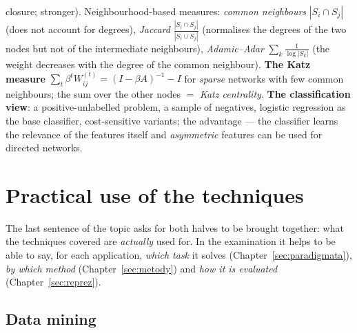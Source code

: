 \documentclass[11pt,a4paper]{article}
\theoremstyle{definition}
\begin{document}
\begin{itemize}
      closure; stronger). Neighbourhood-based measures: \emph{common neighbours} $|S_i\cap S_j|$ (does
      not account for degrees), \emph{Jaccard} $\frac{|S_i\cap S_j|}{|S_i\cup S_j|}$ (normalises the
      degrees of the two nodes but not of the intermediate neighbours), \emph{Adamic--Adar}
      $\sum_{k}\frac{1}{\log|S_k|}$ (the weight decreases with the degree of the common neighbour).
      \textbf{The Katz measure} $\sum_t\beta^tW_{ij}^{(t)}=(I-\beta A)^{-1}-I$ for \emph{sparse}
      networks with few common neighbours; the sum over the other nodes $=$ \emph{Katz centrality}.
      \textbf{The classification view}: a positive-unlabelled problem, a sample of negatives, logistic
      regression as the base classifier, cost-sensitive variants; the advantage --- the classifier
      learns the relevance of the features itself and \emph{asymmetric} features can be used for
      directed networks.
\end{itemize}

\newpage
\section{Practical use of the techniques}
\label{sec:praxe}

The last sentence of the topic asks for both halves to be brought together: what the techniques
covered are \emph{actually} used for. In the examination it helps to be able to say, for each
application, \emph{which task} it solves (Chapter~\ref{sec:paradigmata}), \emph{by which method}
(Chapter~\ref{sec:metody}) and \emph{how it is evaluated} (Chapter~\ref{sec:reprez}).

\subsection{Data mining}
\end{document}
